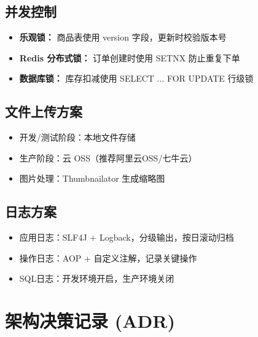 \documentclass[12pt,a4paper,UTF8]{ctexart}
\begin{document}
\subsection{并发控制}

\begin{itemize}[itemsep=3pt]
    \item \textbf{乐观锁：} 商品表使用 version 字段，更新时校验版本号
    \item \textbf{Redis 分布式锁：} 订单创建时使用 SETNX 防止重复下单
    \item \textbf{数据库锁：} 库存扣减使用 SELECT ... FOR UPDATE 行级锁
\end{itemize}

\subsection{文件上传方案}

\begin{itemize}[itemsep=3pt]
    \item 开发/测试阶段：本地文件存储
    \item 生产阶段：云 OSS（推荐阿里云OSS/七牛云）
    \item 图片处理：Thumbnailator 生成缩略图
\end{itemize}

\subsection{日志方案}

\begin{itemize}[itemsep=3pt]
    \item 应用日志：SLF4J + Logback，分级输出，按日滚动归档
    \item 操作日志：AOP + 自定义注解，记录关键操作
    \item SQL日志：开发环境开启，生产环境关闭
\end{itemize}

\newpage
\appendix
\section{架构决策记录 (ADR)}
\end{document}
